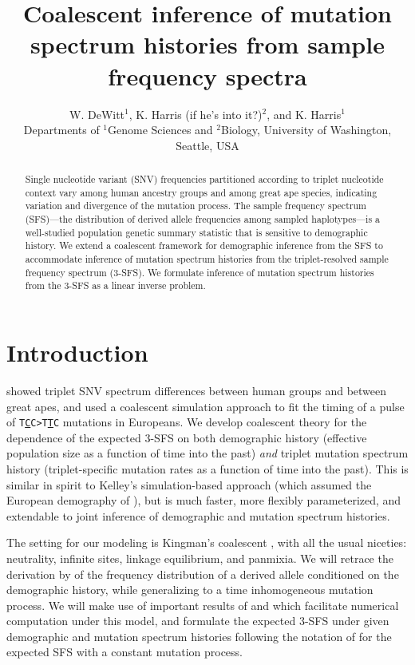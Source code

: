 \documentclass[11pt]{article}
\title{Coalescent inference of mutation spectrum histories from sample frequency spectra}
\author{
W. DeWitt$^{1}$, K. Harris (if he's into it?)$^{2}$, and K. Harris$^{1}$\\
\small{Departments of $^1$Genome Sciences and $^2$Biology, University of Washington, Seattle, USA}
}
\begin{document}
\maketitle

\begin{abstract}

Single nucleotide variant (SNV) frequencies partitioned according to triplet nucleotide context vary among human ancestry groups and among great ape species, indicating variation and divergence of the mutation process.
The sample frequency spectrum (SFS)---the distribution of derived allele frequencies among sampled haplotypes---is a well-studied population genetic summary statistic that is sensitive to demographic history.
We extend a coalescent framework for demographic inference from the SFS to accommodate inference of mutation spectrum histories from the triplet-resolved sample frequency spectrum (3-SFS).
We formulate inference of mutation spectrum histories from the 3-SFS as a linear inverse problem.

\end{abstract}


\section{Introduction}\label{sec:intro}

\cite{Harris2017-fw} showed triplet SNV spectrum differences between human groups and between great apes, and used a coalescent simulation approach to fit the timing of a pulse of \texttt{T\underline{C}C>T\underline{T}C} mutations in Europeans.
We develop coalescent theory for the dependence of the expected 3-SFS on both demographic history (effective population size as a function of time into the past) \emph{and} triplet mutation spectrum history (triplet-specific mutation rates as a function of time into the past).
This is similar in spirit to Kelley's simulation-based approach (which assumed the European demography of \cite{Tennessen2012-dq}), but is much faster, more flexibly parameterized, and extendable to joint inference of demographic and mutation spectrum histories.

The setting for our modeling is Kingman's coalescent \citep{Kingman1982-ge, Kingman1982-tf, Kingman1982-ys, Kingman2000-jr}, with all the usual niceties: neutrality, infinite sites, linkage equilibrium, and panmixia.
We will retrace the derivation by \cite{Griffiths1998-qf} of the frequency distribution of a derived allele conditioned on the demographic history, while generalizing to a time inhomogeneous mutation process.
We will make use of important results of \cite{Polanski2003-kg} and \cite{Polanski2003-ll} which facilitate numerical computation under this model, and formulate the expected 3-SFS under given demographic and mutation spectrum histories following the notation of \cite{Rosen2018-bb} for the expected SFS with a constant mutation process.
\end{document}
